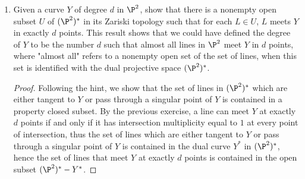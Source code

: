 \documentclass[a4paper]{article}
\begin{document}
\begin{enumerate} [label=\textbf{\arabic*.}, leftmargin=0cm]
  \item[\textbf{4.}] Given a curve $Y$ of degree $d$ in $\P^2$, show that there is a nonempty open subset $U$ of $(\P^2)^*$ in its Zariski topology such that for each $L \in U$, $L$ meets $Y$ in exactly $d$ points.
  This result shows that we could have defined the degree of $Y$ to be the number $d$ such that almost all lines in $\P^2$ meet $Y$ in $d$ points, where "almost all" refers to a nonempty open set of the set of lines, when this set is identified with the dual projective space $(\P^2)^*$.

        \begin{proof}
          Following the hint, we show that the set of lines in $(\P^2)^*$ which are either tangent to $Y$ or pass through a singular point of $Y$ is contained in a property closed subset.
          By the previous exercise, a line can meet $Y$ at exactly $d$ points if and only if it has intersection multiplicity equal to $1$ at every point of intersection, thus the set of lines which are either tangent to $Y$ or pass through a singular point of $Y$ is contained in the dual curve $Y^*$ in $(\P^2)^*$, hence the set of lines that meet $Y$ at exactly $d$ points is contained in the open subset $(\P^2)^* - Y^*$.
        \end{proof}

\end{enumerate}
\end{document}
